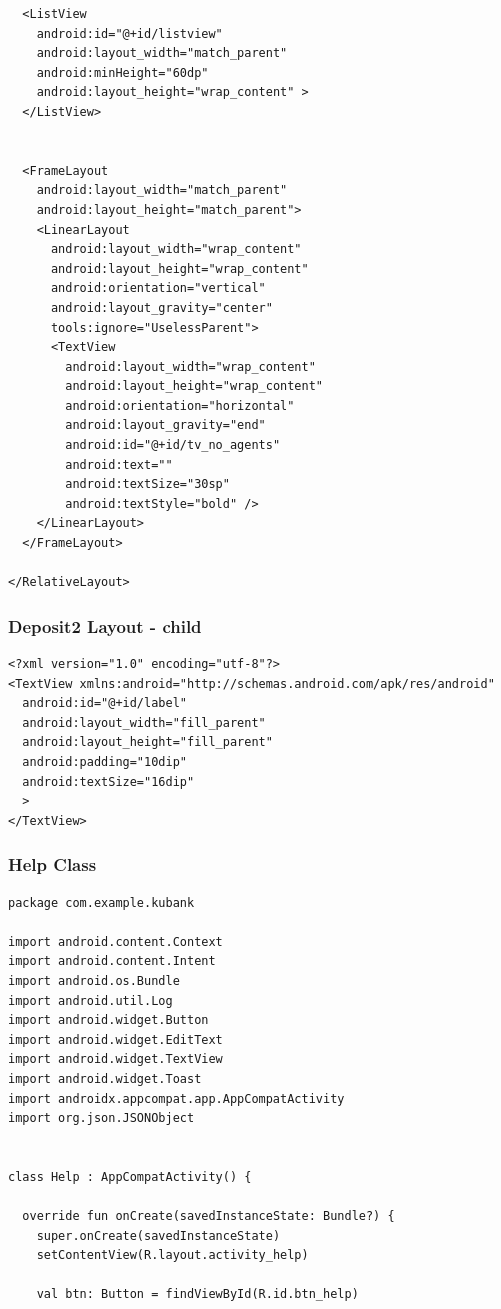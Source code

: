 \documentclass[11pt, a4paper]{article}
\begin{document}
\begin{appendices}
\begin{lstlisting}
  <ListView
    android:id="@+id/listview"
    android:layout_width="match_parent"
    android:minHeight="60dp"
    android:layout_height="wrap_content" >
  </ListView>


  <FrameLayout
    android:layout_width="match_parent"
    android:layout_height="match_parent">
    <LinearLayout
      android:layout_width="wrap_content"
      android:layout_height="wrap_content"
      android:orientation="vertical"
      android:layout_gravity="center"
      tools:ignore="UselessParent">
      <TextView
        android:layout_width="wrap_content"
        android:layout_height="wrap_content"
        android:orientation="horizontal"
        android:layout_gravity="end"
        android:id="@+id/tv_no_agents"
        android:text=""
        android:textSize="30sp"
        android:textStyle="bold" />
    </LinearLayout>
  </FrameLayout>

</RelativeLayout>
\end{lstlisting}
\subsubsection{Deposit2 Layout - child}
\begin{lstlisting}
<?xml version="1.0" encoding="utf-8"?>
<TextView xmlns:android="http://schemas.android.com/apk/res/android"
  android:id="@+id/label"
  android:layout_width="fill_parent"
  android:layout_height="fill_parent"
  android:padding="10dip"
  android:textSize="16dip"
  >
</TextView>
\end{lstlisting}
\subsubsection{Help Class}
\begin{lstlisting}
package com.example.kubank

import android.content.Context
import android.content.Intent
import android.os.Bundle
import android.util.Log
import android.widget.Button
import android.widget.EditText
import android.widget.TextView
import android.widget.Toast
import androidx.appcompat.app.AppCompatActivity
import org.json.JSONObject


class Help : AppCompatActivity() {

  override fun onCreate(savedInstanceState: Bundle?) {
    super.onCreate(savedInstanceState)
    setContentView(R.layout.activity_help)

    val btn: Button = findViewById(R.id.btn_help)


\end{lstlisting}
\end{appendices}
\end{document}
